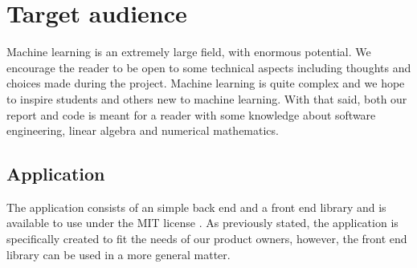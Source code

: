 \section{Target audience}
Machine learning is an extremely large field, with enormous potential. We encourage the reader to be open to some technical aspects including thoughts and choices made during the project. Machine learning is quite complex and we hope to inspire students and others new to machine learning. With that said, both our report and code is meant for a reader with some knowledge about software engineering, linear algebra and numerical mathematics. 



\subsection{Application}
The application consists of an simple back end and a front end library and is available to use under the MIT license \cite{_mit_????}. As previously stated, the application is specifically created to fit the needs of our product owners, however, the front end library can be used in a more general matter. %


